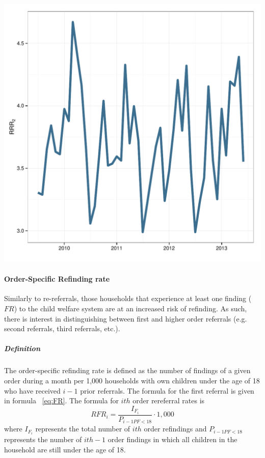 \documentclass[12pt]{article}\usepackage[]{graphicx}\usepackage[]{color}
\makeatletter
\def\maxwidth{ %
  \ifdim\Gin@nat@width>\linewidth
    \linewidth
  \else
    \Gin@nat@width
  \fi
}
\newenvironment{knitrout}{}{} %
\makeatother
\begin{document}
\begin{knitrout}
{\centering \includegraphics[width=\maxwidth]{figure/RRRi} 

}



\end{knitrout}

\paragraph{Order-Specific Refinding rate} Similarly to re-referrals, those households that experience at least one finding ($FR$) to the child welfare system are at an increased risk of refinding. As such, there is interest in distinguishing between first and higher order referrals (e.g. second referrals, third referrals, etc.). 

\subparagraph{Definition} The order-specific refinding rate is defined as the number of findings of a given order during a month per 1,000 households with own children under the age of 18 who have received $i-1$ prior referrals. The formula for the first referral is given in formula ~\ref{eq:FR}. The formula for $ith$ order rereferral rates is 
\begin{equation}\label{eq:RRRi}
RFR_i = \frac{I_{F_i}}{P_{i-1PF<18}} \cdot 1,000
\end{equation}
where $I_{F_i}$ represents the total number of $ith$ order refindings and $P_{i-1PF<18}$ represents the number of $ith-1$ order findings in which all children in the household are still under the age of 18.  
\end{document}
